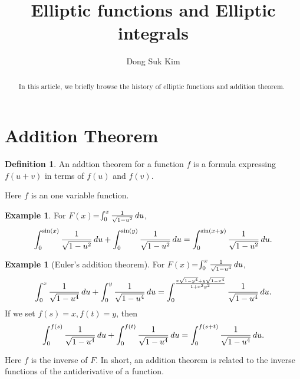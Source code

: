 \documentclass[11pt]{amsart}
\theoremstyle{definition}
\newtheorem{exmp}[thm]{Example}
\newtheorem{defn}[thm]{Definition}
\begin{document}
\title[]
{Elliptic functions and Elliptic integrals}
\author{Dong Suk Kim}

\maketitle
\begin{abstract} 

 In this article, we briefly browse the history of elliptic functions and addition theorem. 

\end{abstract}


\section{Addition Theorem}

\begin{defn} An addtion theorem for a function $f$ is a formula expressing $f(u+v)$ in terms of $f(u)$ and $f(v)$.
\end{defn}

Here $f$ is an one variable function. 


\vspace{2ex}

\begin{exmp} For $F(x)$=$\int_{0}^{x} {1 \over \sqrt{1-u^{2}}}\, du$, 
\begin{equation*} \int_{0}^{\sin(x)} {1 \over \sqrt{1-u^{2}}}\, du + \int_{0}^{\sin(y)} {1 \over \sqrt{1-u^{2}}}\, du = \int_{0}^{\sin(x+y)} {1 \over \sqrt{1-u^{2}}}\, du.
\end{equation*}
 \end{exmp}

\vspace{2ex}

\begin{exmp}[Euler's addition theorem] For
$F(x)$=$\int_{0}^{x} {1 \over \sqrt{1-u^{4}}}\, du$, 
\begin{equation*} \int_{0}^{x} {1 \over \sqrt{1-u^{4}}}\, du + \int_{0}^{y} {1 \over \sqrt{1-u^{4}}}\, du = \int_{0}^{ {x\sqrt{1-y^{4}}+y\sqrt{1-x^{4}} \over 1+x^{2}y^{2}} } {1 \over \sqrt{1-u^{4}}}\, du.
\end{equation*} 
If we set $f(s)=x, f(t)=y$, then
\begin{equation*} \int_{0}^{f(s)} {1 \over \sqrt{1-u^{4}}}\, du + \int_{0}^{f(t)} {1 \over \sqrt{1-u^{4}}}\, du = \int_{0}^ {f(s+t)} {1 \over \sqrt{1-u^{4}}}\, du.
\end{equation*} 

Here $f$ is the inverse of $F$.
In short, an addition theorem is related to the inverse functions of the antiderivative of a function.

\end{exmp}
\end{document}
